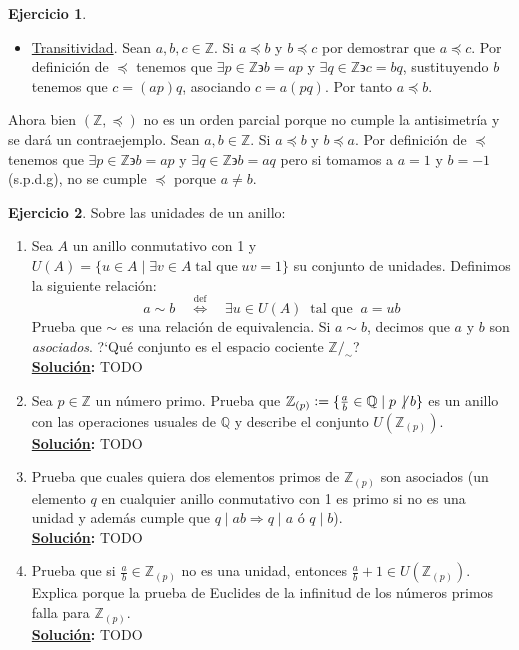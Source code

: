 \documentclass[11pt,letterpaper]{article}
\theoremstyle{definition}\newtheorem{p}{Ejercicio}
\theoremstyle{definition}\newtheorem{pp}[p]{$(*)$Ejercicio}
\numberwithin{p}{section}
\newcommand{\Z}{\mathbb{Z}}
\newcommand{\Q}{\mathbb{Q}}
\newcommand{\ent}{\Longrightarrow}
\newcommand{\sii}{\Longleftrightarrow}
\newcommand{\sol}{\textbf{\underline{Solución}: }} %
\begin{document}
\begin{p}
\begin{itemize}
    \item \underline{Transitividad}. Sean $a, b, c \in \Z$. Si $a \preccurlyeq b$ y $b \preccurlyeq c$ 
      por demostrar que $a \preccurlyeq c$.
      Por definición de $\preccurlyeq$ tenemos que $\exists p \in \Z \backepsilon b=ap$ y 
      $\exists q \in \Z \backepsilon c=bq$, sustituyendo $b$ tenemos que $c=(ap)q$, asociando
      $c=a(pq)$. Por tanto $a \preccurlyeq b$.      
  \end{itemize}
    
    Ahora bien $(\Z, \preccurlyeq)$ no es un orden parcial porque no cumple la antisimetría y 
    se dará un contraejemplo.
    Sean $a, b \in \Z$. Si $a \preccurlyeq b$ y $b \preccurlyeq a$. Por definición de $\preccurlyeq$ 
    tenemos que $\exists p \in \Z \backepsilon b=ap$ y $\exists q \in \Z \backepsilon b=aq$ pero si 
    tomamos a $a=1$ y $b=-1$ (s.p.d.g), no se cumple $\preccurlyeq$ porque $a \neq b$.
\end{p}

\begin{p} Sobre las unidades de un anillo:
  \begin{enumerate}
  \item Sea $A$ un anillo conmutativo con 1 y
    $U(A)=\{u\in A\mid \exists v\in A\;\text{tal que}\; uv=1\}$ su conjunto de unidades. Definimos la
    siguiente relaci\'on:
    \[
      a\sim b \quad\stackrel{\text{def}}{\sii}\quad \exists u\in U(A)\;\;\text{tal que}\;\; a=ub
    \]
    Prueba que $\sim$ es una relaci\'on de equivalencia. Si $a\sim b$, decimos que $a$ y $b$ son
    \emph{asociados}. ?`Qu\'e conjunto es el espacio cociente $\Z/_{\sim}$?\\
    \sol TODO
    
  \item Sea $p\in\Z$ un n\'umero primo. Prueba que $\Z_{(p)}:=\{\frac{a}{b}\in\Q\mid p\not\,\mid b\}$
    es un anillo con las operaciones usuales de $\Q$ y describe el conjunto $U(\Z_{(p)})$.\\
  \sol TODO
    
  \item Prueba que cuales quiera dos elementos primos de $\Z_{(p)}$ son asociados (un elemento
    $q$ en cualquier anillo conmutativo con 1 es primo si no es una unidad y adem\'as cumple
    que $q\mid ab \ent q\mid a$ \'o $q\mid b$).\\
  \sol TODO
  
  \item Prueba que si $\frac{a}{b}\in\Z_{(p)}$ no es una unidad, entonces
    $\frac{a}{b}+1\in U(\Z_{(p)})$. Explica porque la prueba de Euclides de la infinitud de los
    n\'umeros primos falla para $\Z_{(p)}$.\\
  \sol TODO
  
  \end{enumerate}
  
\end{p}
\end{document}
